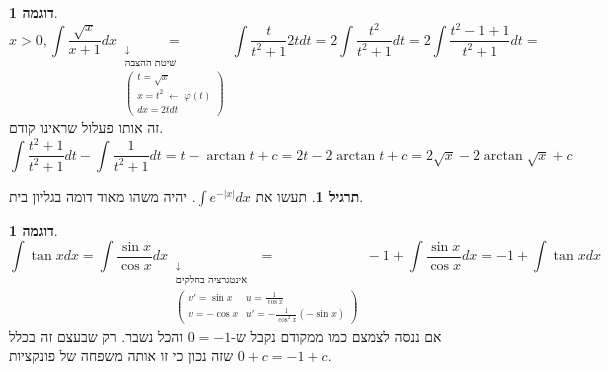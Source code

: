 \documentclass[12pt]{article}
\let\oldint\int
\renewcommand{\int}{\oldint\limits}
\theoremstyle{plain}
\theoremstyle{definition}
\newtheorem{example}[theorem]{דוגמה}      %
\newtheorem{exercise}[theorem]{תרגיל}     %
\theoremstyle{remark}
\begin{document}
\begin{example}
\[
{x>0, \int \frac{\sqrt{ x }}{x+1}dx \underset{\begin{matrix}
\downarrow \\
{\text{שיטת ההצבה}} \\
\begin{pmatrix}
t=\sqrt{ x } \\
x=t^2\; \leftarrow\; \varphi(t) \\
dx=2tdt
\end{pmatrix}
\end{matrix}}{=}\int \frac{t}{t^2+1}2tdt=2\int \frac{t^2}{t^2+1}dt=2\int \frac{t^2-1+1}{t^2+1}dt=}
\]
זה אותו פעלול שראינו קודם.\[
{\int \frac{t^2+1}{t^2+1}dt-\int \frac{1}{t^2+1}dt=t-\arctan t+c
=2t-2\arctan t+c=2\sqrt{ x }-2\arctan \sqrt{ x }+c}
\]

\end{example}
\begin{exercise}
תעשו את \({\int e^{-|x|}dx}\). יהיה משהו מאוד דומה בגליון בית.
\end{exercise}
\begin{example}
\[
{\int \tan xdx=\int \frac{\sin x}{\cos x}dx \underset{\begin{matrix}
\downarrow \\
{\text{אינטגרציה בחלקים}} \\
\begin{pmatrix}
v'=\sin x & u=\frac{1}{\cos x} \\
v=-\cos x & u'=-\frac{1}{\cos^2x}(-\sin x)
\end{pmatrix}
\end{matrix}}{=}-1+\int \frac{\sin x}{\cos x}dx=-1+\int \tan xdx}
\]
אם ננסה לצמצם כמו ממקודם נקבל ש-\({0=-1}\) והכל נשבר. רק שבעצם זה בכלל \({0+c=-1+c}\) שזה נכון כי זו אותה משפחה של פונקציות.
\end{example}
\end{document}

